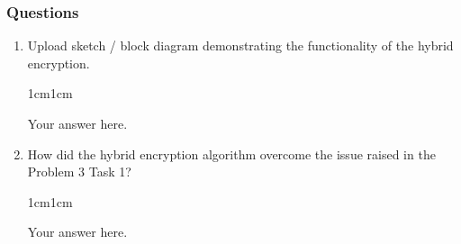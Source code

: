 \documentclass[11pt,letterpaper]{article}
\newenvironment{answer}{\em \color{blue} \begin{adjustwidth}{1cm}{1cm}}{\end{adjustwidth}}
\begin{document}
\subsubsection*{Questions}
\begin{enumerate}
    \item Upload sketch / block diagram demonstrating the functionality of the hybrid encryption.
        \begin{answer}
	
		Your answer here.
		
	\end{answer}
    \item How did the hybrid encryption algorithm overcome the issue raised in the Problem 3 Task 1?
        \begin{answer}
	
		Your answer here.
		
	\end{answer}
\end{enumerate}

\end{document}
